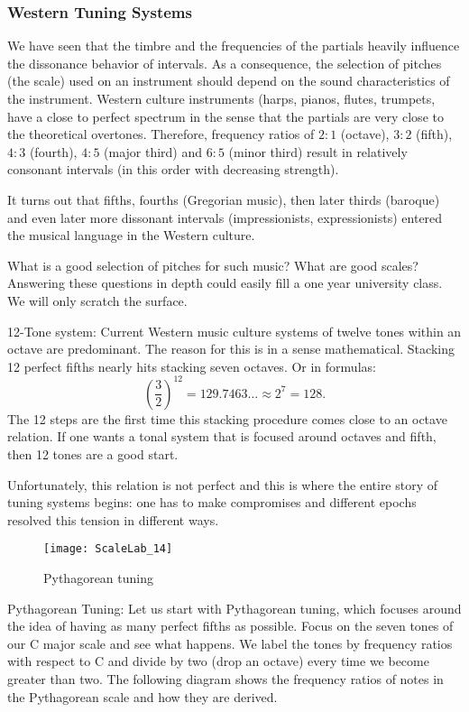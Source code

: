 \subsubsection{Western Tuning Systems}
We have seen that the timbre and the frequencies of the partials heavily influence the dissonance behavior of intervals. As a consequence, the selection of pitches (the scale) used on an instrument should depend on the sound characteristics of the instrument. Western culture instruments (harps, pianos, flutes, trumpets, have a close to perfect spectrum in the sense that the partials are very close to the theoretical overtones. Therefore, frequency ratios of $2 : 1$ (octave), $3 : 2$ (fifth), $4 : 3$ (fourth), $4 : 5$ (major third) and $6 : 5$ (minor third) result in relatively consonant intervals (in this order with decreasing strength). 

It turns out that fifths, fourths (Gregorian music), then later thirds (baroque) and even later more dissonant intervals (impressionists, expressionists) entered the musical language in the Western culture. 

What is a good selection of pitches for such music? What are good scales? Answering these questions in depth could easily fill a one year university class. We will only scratch the surface. 


12-Tone system: Current Western music culture systems of twelve tones within an octave are predominant. The reason for this is in a sense mathematical. Stacking 12 perfect fifths nearly hits stacking seven octaves. Or in formulas:
$$\left( \frac{3}{2}\right)^{12} = 129.7463 \ldots \approx 2^7 = 128 .$$
The 12 steps are the first time this stacking procedure comes close to an octave relation. If one wants a tonal system that is focused around octaves and fifth, then 12 tones are a good start.

Unfortunately, this relation is not perfect and this is where the entire story of tuning systems begins: one has to make compromises and different epochs resolved this tension in different ways.

\begin{figure}[h]
\centering
\texttt{[image: ScaleLab\_14]}
\caption*{Pythagorean tuning}
\end{figure}


Pythagorean Tuning: Let us start with Pythagorean tuning, which focuses around the idea of having as many perfect fifths as possible. Focus on the seven tones of our C major scale and see what happens. We label the tones by frequency ratios with respect to C and divide by two (drop an octave) every time we become greater than two. The following diagram shows the frequency ratios of notes in the Pythagorean scale and how they are derived. 


